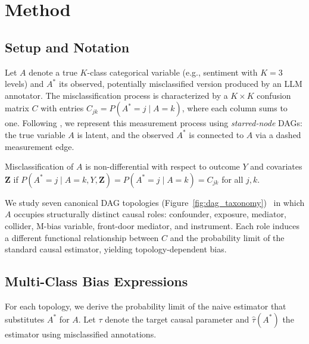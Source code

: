 \section{Method}
\label{sec:method}

\subsection{Setup and Notation}
\label{sec:notation}

Let $A$ denote a true $K$-class categorical variable (e.g., sentiment with $K{=}3$ levels) and $A^*$ its observed, potentially misclassified version produced by an LLM annotator. The misclassification process is characterized by a $K{\times}K$ confusion matrix $C$ with entries $C_{jk} = P(A^*{=}j \mid A{=}k)$, where each column sums to one. Following \citet{hernan_cole2009}, we represent this measurement process using \emph{starred-node} DAGs: the true variable $A$ is latent, and the observed $A^*$ is connected to $A$ via a dashed measurement edge.

\begin{definition}
\label{def:nondiff}
Misclassification of $A$ is non-differential with respect to outcome $Y$ and covariates $\mathbf{Z}$ if $P(A^*{=}j \mid A{=}k, Y, \mathbf{Z}) = P(A^*{=}j \mid A{=}k) = C_{jk}$ for all $j,k$.
\end{definition}

We study seven canonical DAG topologies (Figure~\ref{fig:dag_taxonomy})~\cite{pearl2009} in which $A$ occupies structurally distinct causal roles: confounder, exposure, mediator, collider, M-bias variable, front-door mediator, and instrument. Each role induces a different functional relationship between $C$ and the probability limit of the standard causal estimator, yielding topology-dependent bias.

\subsection{Multi-Class Bias Expressions}
\label{sec:bias_expressions}

For each topology, we derive the probability limit of the naive estimator that substitutes $A^*$ for $A$. Let $\tau$ denote the target causal parameter and $\hat{\tau}(A^*)$ the estimator using misclassified annotations.

